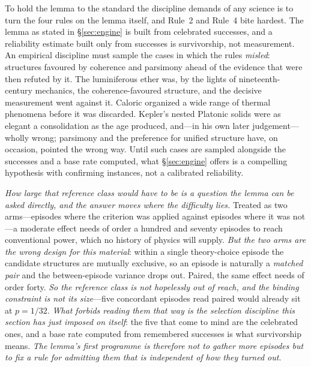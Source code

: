 \documentclass[11pt,a4paper]{article}
\begin{document}
To hold the lemma to the standard the discipline demands of any science is to turn the four rules on the lemma itself, and Rule~2 and Rule~4 bite hardest. The lemma as stated in \S\ref{sec:engine} is built from celebrated successes, and a reliability estimate built only from successes is survivorship, not measurement. An empirical discipline must sample the cases in which the rules \emph{misled}: structures favoured by coherence and parsimony ahead of the evidence that were then refuted by it. The luminiferous ether was, by the lights of nineteenth-century mechanics, the coherence-favoured structure, and the decisive measurement went against it. Caloric organized a wide range of thermal phenomena before it was discarded. Kepler's nested Platonic solids were as elegant a consolidation as the age produced, and---in his own later judgement---wholly wrong; parsimony and the preference for unified structure have, on occasion, pointed the wrong way. Until such cases are sampled alongside the successes and a base rate computed, what \S\ref{sec:engine} offers is a compelling hypothesis with confirming instances, not a calibrated reliability.

\emph{How large that reference class would have to be is a question the lemma can be asked directly, and the answer moves where the difficulty lies.} Treated as two arms---episodes where the criterion was applied against episodes where it was not---a moderate effect needs of order a hundred and seventy episodes to reach conventional power, which no history of physics will supply. \emph{But the two arms are the wrong design for this material}: within a single theory-choice episode the candidate structures are mutually exclusive, so an episode is naturally a \emph{matched pair} and the between-episode variance drops out. Paired, the same effect needs of order forty. \emph{So the reference class is not hopelessly out of reach, and the binding constraint is not its size}---five concordant episodes read paired would already sit at $p=1/32$. \emph{What forbids reading them that way is the selection discipline this section has just imposed on itself}: the five that come to mind are the celebrated ones, and a base rate computed from remembered successes is what survivorship means. \emph{The lemma's first programme is therefore not to gather more episodes but to fix a rule for admitting them that is independent of how they turned out}.
\end{document}
